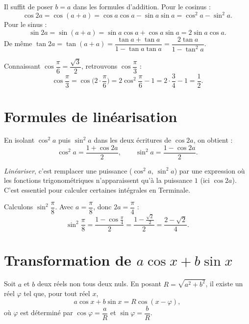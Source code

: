 \begin{exemple}
Il suffit de poser $b=a$ dans les formules d'addition. Pour le cosinus :
\[
  \cos 2a=\cos(a+a)=\cos a\cos a-\sin a\sin a=\cos^2 a-\sin^2 a.
\]
Pour le sinus :
\[
  \sin 2a=\sin(a+a)=\sin a\cos a+\cos a\sin a=2\sin a\cos a.
\]
De même $\tan 2a=\tan(a+a)=\dfrac{\tan a+\tan a}{1-\tan a\tan a}=\dfrac{2\tan a}{1-\tan^2 a}$.
\end{exemple}

\begin{exemple}
Connaissant $\cos\dfrac{\pi}{6}=\dfrac{\sqrt3}{2}$, retrouvons $\cos\dfrac{\pi}{3}$ :
\[
  \cos\frac{\pi}{3}=\cos\!\Big(2\cdot\frac{\pi}{6}\Big)=2\cos^2\frac{\pi}{6}-1
  =2\cdot\frac34-1=\frac12.
\]
\end{exemple}

\section{Formules de linéarisation}

\begin{propriete}
En isolant $\cos^2 a$ puis $\sin^2 a$ dans les deux écritures de $\cos 2a$, on
obtient :
\[
  \cos^2 a=\frac{1+\cos 2a}{2},\qquad
  \sin^2 a=\frac{1-\cos 2a}{2}.
\]
\end{propriete}

\begin{remarque}
\emph{Linéariser}, c'est remplacer une puissance ($\cos^2 a$, $\sin^2 a$) par une
expression où les fonctions trigonométriques n'apparaissent qu'à la puissance $1$
(ici $\cos 2a$). C'est essentiel pour calculer certaines intégrales en Terminale.
\end{remarque}

\begin{exemple}
Calculons $\sin^2\dfrac{\pi}{8}$. Avec $a=\dfrac{\pi}{8}$, donc $2a=\dfrac{\pi}{4}$ :
\[
  \sin^2\frac{\pi}{8}=\frac{1-\cos\frac{\pi}{4}}{2}
  =\frac{1-\frac{\sqrt2}{2}}{2}=\frac{2-\sqrt2}{4}.
\]
\end{exemple}

\section{Transformation de $a\cos x+b\sin x$}

\begin{theoreme}
Soit $a$ et $b$ deux réels non tous deux nuls. En posant $R=\sqrt{a^2+b^2}$, il
existe un réel $\varphi$ tel que, pour tout réel $x$,
\[
  a\cos x+b\sin x=R\cos(x-\varphi),
\]
où $\varphi$ est déterminé par $\cos\varphi=\dfrac{a}{R}$ et $\sin\varphi=\dfrac{b}{R}$.
\end{theoreme}

